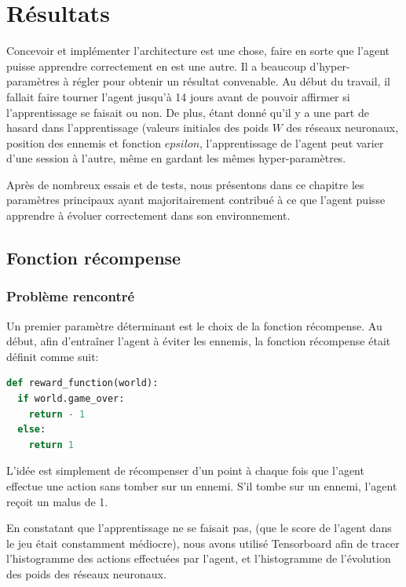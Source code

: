 \documentclass[11pt,a4paper]{report}
\begin{document}
  \chapter{Résultats}
  
  \par Concevoir et implémenter l'architecture est une chose, faire en sorte que l'agent puisse apprendre correctement en est une autre. Il a beaucoup d'hyper-paramètres  à régler pour obtenir un résultat convenable. Au début du travail, il fallait faire tourner l'agent jusqu'à 14 jours avant de pouvoir affirmer si l'apprentissage se faisait ou non. De plus, étant donné qu'il y a une part de hasard dans l'apprentissage (valeurs initiales des poids $W$ des réseaux neuronaux, position des ennemis et fonction $epsilon$, l'apprentissage de l'agent peut varier d'une session à l'autre, même en gardant les mêmes hyper-paramètres. 
  
  \par Après de nombreux essais et de tests, nous présentons dans ce chapitre les paramètres principaux ayant majoritairement contribué à ce que l'agent puisse apprendre à évoluer correctement dans son environnement. 
  
  \section{Fonction récompense}
  
  \subsection{Problème rencontré}
  
  \par Un premier paramètre déterminant est le choix de la fonction récompense. Au début, afin d’entraîner l'agent à éviter les ennemis, la fonction récompense était définit comme suit: 
  
  \begin{lstlisting}[language=python]
def reward_function(world):
  if world.game_over:
    return - 1
  else:
    return 1
  \end{lstlisting} 
  
  \par L'idée est simplement de récompenser d'un point à chaque fois que l'agent effectue une action sans tomber sur un ennemi. S'il tombe sur un ennemi, l'agent reçoit un malus de 1.
  
  \par En constatant que l'apprentissage ne se faisait pas, (que le score de l'agent dans le jeu était constamment médiocre), nous avons utilisé Tensorboard afin de tracer l'histogramme des actions effectuées par l'agent, et l'histogramme de l'évolution des poids des réseaux neuronaux. 
  
\end{document}
